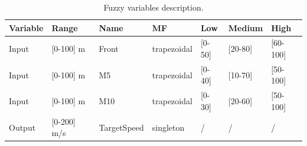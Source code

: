 \documentclass[conference]{IEEEtran}
\begin{document}
\begin{table}
	\centering
	{\scriptsize
		\caption{Fuzzy variables description.}
		\label{tab:flouevar}
		\begin{tabular}{ |p{1.5cm}|p{2cm}|p{2cm}|p{2 cm}|p{1 cm}|p{1.5 cm}|p{1.5 cm}|}
			\hline
			{ \textbf{Variable}}&
			{ \textbf{Range}}&
			{ \textbf{Name}}&  
			{ \textbf{MF}} &
			{ \textbf{Low}} &
			{ \textbf{Medium}}&
			{ \textbf{High}} \\
			\hline
			Input & [0-100] m & Front & trapezoidal & [0-50] & [20-80] & [60-100]
			\\
			\hline
			Input & [0-100] m & M5 & trapezoidal &[0-40] & [10-70] & [50-100] 
			\\
			\hline
			Input & [0-100] m  & M10 & trapezoidal & [0-30] & [20-60] & [50-100]
			\\
			\hline 
			Output & [0-200] m/s & TargetSpeed & singleton & / & / & /
			\\
			\hline 
		\end{tabular} 
	}
\end{table}




\end{document}

